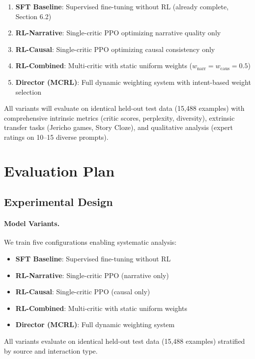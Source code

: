 \documentclass[11pt]{article}
\begin{document}
\begin{enumerate}
    \item \textbf{SFT Baseline}: Supervised fine-tuning without RL (already complete, Section 6.2)
    \item \textbf{RL-Narrative}: Single-critic PPO optimizing narrative quality only
    \item \textbf{RL-Causal}: Single-critic PPO optimizing causal consistency only
    \item \textbf{RL-Combined}: Multi-critic with static uniform weights ($w_{\text{narr}} = w_{\text{caus}} = 0.5$)
    \item \textbf{Director (MCRL)}: Full dynamic weighting system with intent-based weight selection
\end{enumerate}

All variants will evaluate on identical held-out test data (15,488 examples) with comprehensive intrinsic metrics (critic scores, perplexity, diversity), extrinsic transfer tasks (Jericho games, Story Cloze), and qualitative analysis (expert ratings on 10--15 diverse prompts).


\section{Evaluation Plan}

\subsection{Experimental Design}

\paragraph{Model Variants.} We train five configurations enabling systematic analysis:

\begin{itemize}
    \item \textbf{SFT Baseline}: Supervised fine-tuning without RL
    \item \textbf{RL-Narrative}: Single-critic PPO (narrative only)
    \item \textbf{RL-Causal}: Single-critic PPO (causal only)
    \item \textbf{RL-Combined}: Multi-critic with static uniform weights
    \item \textbf{Director (MCRL)}: Full dynamic weighting system
\end{itemize}

All variants evaluate on identical held-out test data (15,488 examples) stratified by source and interaction type.
\end{document}

